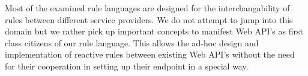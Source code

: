 Most of the examined rule languages are designed for the interchangability of rules between different service providers. We do not attempt to jump into this domain but we rather pick up important concepts to manifest Web API's as first class citizens of our rule language. This allows the ad-hoc design and implementation of reactive rules between existing Web API's without the need for their cooperation in setting up their endpoint in a special way.




